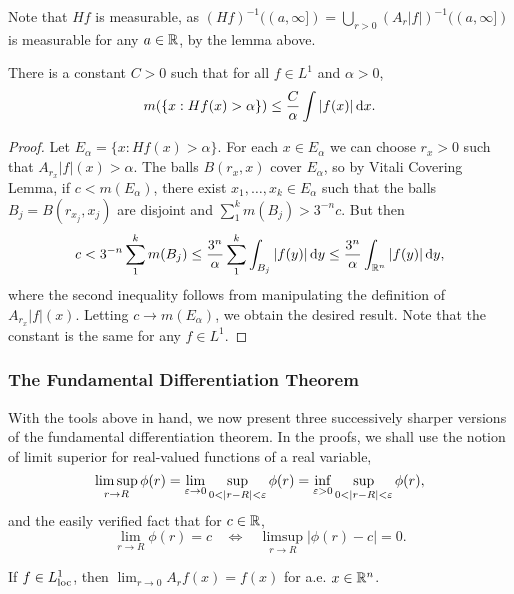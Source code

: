\documentclass[12pt]{article} %
\begin{document}
\noindent Note that $Hf$ is measurable, as $(Hf)^{-1}((a, \infty]) = \bigcup_{r > 0} (A_r|f|)^{-1}((a, \infty])$ is measurable for any $a \in \mathbb{R}$, by the lemma above.

\begin{theorem}
    There is a constant $C > 0$ such that for all $f \in L^1$ and $\alpha > 0$, \[m(\{x : Hf(x) > \alpha\}) \leq \frac{C}{\alpha} \int |f(x)| \, \mathrm{d} x.\]
\end{theorem}

\begin{proof}
    Let $E_\alpha = \{x : Hf(x) > \alpha\}$. For each $x \in E_\alpha$ we can choose $r_x > 0$ such that $A_{r_x}|f|(x) > \alpha$. The balls $B(r_x, x)$ cover $E_\alpha$, so by Vitali Covering Lemma, if $c < m(E_\alpha)$, there exist $x_1, \ldots, x_k \in E_\alpha$ such that the balls $B_j = B(r_{x_j}, x_j)$ are disjoint and $\sum_1^k m(B_j) > 3^{-n} c$. But then \[c < 3^{-n} \sum_1^k m(B_j) \leq \frac{3^n}{\alpha} \sum_1^k \int_{B_j} |f(y)|\, \mathrm{d} y \leq \frac{3^n}{\alpha} \int_{\mathbb{R}^n} |f(y)|\, \mathrm{d} y,\] where the second inequality follows from manipulating the definition of $A_{r_x}|f|(x)$. Letting $c \to m(E_\alpha)$, we obtain the desired result. Note that the constant is the same for any $f \in L^1$.
\end{proof}

\subsubsection{The Fundamental Differentiation Theorem}

With the tools above in hand, we now present three successively sharper versions of the fundamental differentiation theorem. In the proofs, we shall use the notion of limit superior for real-valued functions of a real variable, \[\limsup_{r \to R} \phi(r) = \lim_{\varepsilon \to 0} \sup_{0 < |r - R| < \varepsilon} \phi(r) = \inf_{\varepsilon > 0} \sup_{0 < |r - R| < \varepsilon} \phi(r),\] and the easily verified fact that for $c \in \mathbb{R}$, \[\lim_{r \to R} \phi(r) = c \ \ \ \ \iff \ \ \ \ \limsup_{r \to R} |\phi(r) - c| = 0.\]

\begin{theorem}\label{thm:3.18}
    If $f \in L_{\operatorname{loc}}^1$, then $\lim_{r \to 0} A_r f(x) = f(x)$ for a.e. $x \in \mathbb{R}^n$.
\end{theorem}
\end{document}
